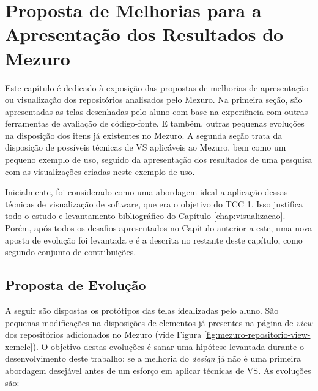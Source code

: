 \chapter{Proposta de Melhorias para a Apresentação dos Resultados do Mezuro}

Este capítulo é dedicado à exposição das propostas de melhorias de apresentação
ou visualização dos repositórios analisados pelo Mezuro. Na primeira seção, são
apresentadas as telas desenhadas pelo aluno com base na experiência com outras
ferramentas de avaliação de código-fonte. E também, outras pequenas evoluções
na disposição dos itens já existentes no Mezuro. A segunda seção trata da
disposição de possíveis técnicas de VS aplicáveis ao Mezuro, bem como um pequeno
exemplo de uso, seguido da apresentação dos resultados de uma pesquisa com as
visualizações criadas neste exemplo de uso.

Inicialmente, foi considerado como uma abordagem ideal a aplicação dessas
técnicas de visualização de software, que era o objetivo do TCC 1. Isso
justifica todo o estudo e levantamento bibliográfico do Capítulo
\ref{chap:visualizacao}. Porém, após todos os desafios apresentados no Capítulo
anterior a este, uma nova aposta de evolução foi levantada e é a descrita no
restante deste capítulo, como segundo conjunto de contribuições.

\section{Proposta de Evolução}

A seguir são dispostas os protótipos das telas idealizadas pelo aluno. São
pequenas modificações na disposições de elementos já presentes na página de
\textit{view} dos repositórios adicionados no Mezuro (vide Figura
\ref{fig:mezuro-repositorio-view-xemele}). O objetivo destas evoluções é sanar
uma hipótese levantada durante o desenvolvimento deste trabalho: se a melhoria do
\textit{design} já não é uma primeira abordagem desejável antes  de um esforço
em aplicar técnicas de VS. As evoluções são:

